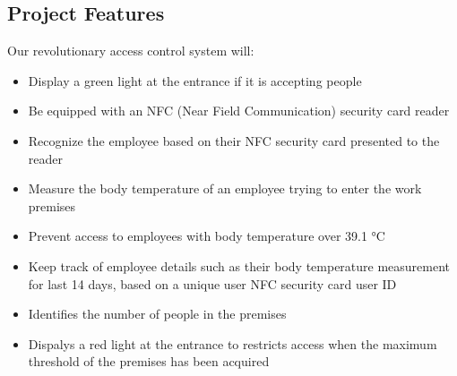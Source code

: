 \subsection{Project Features}

Our revolutionary access control system will:
\begin{itemize}
    \item Display a green light at the entrance if it is accepting people
    \item Be equipped with an NFC (Near Field Communication) security card
          reader
    \item Recognize the employee based on their NFC security card presented to
          the reader 
    \item Measure the body temperature of an employee trying to enter the work
          premises 
    \item Prevent access to employees with body temperature over 39.1 °C
    \item Keep track of employee details such as their body temperature
          measurement for last 14 days, based on a unique user NFC security card
          user ID
    \item Identifies the number of people in the premises 
    \item Dispalys a red light at the entrance to restricts access when the
          maximum threshold of the premises has been acquired
\end{itemize}

